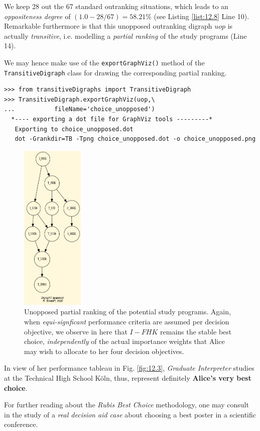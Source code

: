 We keep 28 out the 67 standard outranking situations, which leads to an \emph{oppositeness degree} of $(1.0 - 28/67) = 58.21\%$ (see Listing \ref{list:12.8} Line 10). Remarkable furthermore is that this unopposed outranking digraph $uop$ is actually \emph{transitive}, i.e. modelling a \emph{partial ranking} of the study programs (Line 14).

We may hence make use of the \texttt{exportGraphViz()} method of the\\ \texttt{TransitiveDigraph} class for drawing the corresponding partial ranking.

\begin{lstlisting}
>>> from transitiveDigraphs import TransitiveDigraph
>>> TransitiveDigraph.exportGraphViz(uop,\
...           fileName='choice_unopposed')
  *---- exporting a dot file for GraphViz tools ---------*
   Exporting to choice_unopposed.dot
   dot -Grankdir=TB -Tpng choice_unopposed.dot -o choice_unopposed.png
\end{lstlisting}
\begin{figure}[h]
\sidecaption
\includegraphics[width=3cm]{Figures/AliceChoice_unopposed.png}
\caption{Unopposed partial ranking of the potential study programs. Again, when \emph{equi-signficant} performance criteria are assumed per decision objective, we observe in here that $I-FHK$ remains the stable best choice, \emph{independently} of the actual importance weights that Alice may wish to allocate to her four decision objectives.}
\label{fig:12.7}       %
\end{figure}
\clearpage
In view of her performance tableau in Fig. \ref{fig:12.3}, \emph{Graduate Interpreter} studies at the Technical High School Köln, thus, represent definitely \textbf{Alice's very best choice}.

For further reading about the \emph{Rubis Best Choice} methodology, one may consult in \citep{BIS-2015} the study of a \emph{real decision aid case} about choosing a best poster in a scientific conference.
 
\clearpage
{}
{}

\typeout{}

%